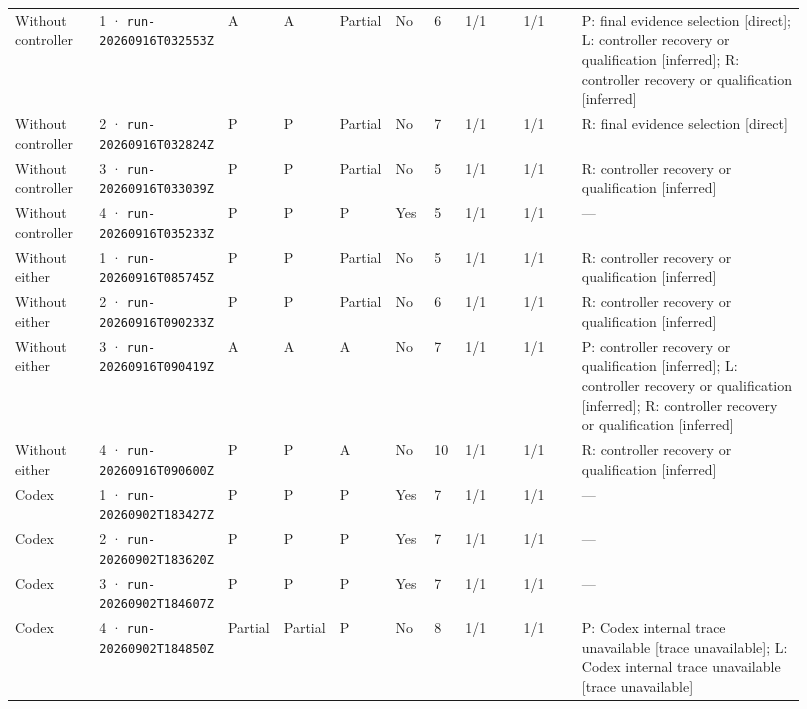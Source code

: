 \begin{landscape}
\begin{longtable}{@{}L{0.11\linewidth}L{0.16\linewidth}*{3}{L{0.022\linewidth}}L{0.05\linewidth}L{0.045\linewidth}L{0.08\linewidth}L{0.085\linewidth}L{0.324\linewidth}@{}}
Without controller & 1 · \texttt{run-20260916\allowbreak T032553Z} & A & A & Partial & No & 6 & 1/1 & 1/1 & P: final evidence selection [direct]; L: controller recovery or qualification [inferred]; R: controller recovery or qualification [inferred] \\
Without controller & 2 · \texttt{run-20260916\allowbreak T032824Z} & P & P & Partial & No & 7 & 1/1 & 1/1 & R: final evidence selection [direct] \\
Without controller & 3 · \texttt{run-20260916\allowbreak T033039Z} & P & P & Partial & No & 5 & 1/1 & 1/1 & R: controller recovery or qualification [inferred] \\
Without controller & 4 · \texttt{run-20260916\allowbreak T035233Z} & P & P & P & Yes & 5 & 1/1 & 1/1 & --- \\
Without either & 1 · \texttt{run-20260916\allowbreak T085745Z} & P & P & Partial & No & 5 & 1/1 & 1/1 & R: controller recovery or qualification [inferred] \\
Without either & 2 · \texttt{run-20260916\allowbreak T090233Z} & P & P & Partial & No & 6 & 1/1 & 1/1 & R: controller recovery or qualification [inferred] \\
Without either & 3 · \texttt{run-20260916\allowbreak T090419Z} & A & A & A & No & 7 & 1/1 & 1/1 & P: controller recovery or qualification [inferred]; L: controller recovery or qualification [inferred]; R: controller recovery or qualification [inferred] \\
Without either & 4 · \texttt{run-20260916\allowbreak T090600Z} & P & P & A & No & 10 & 1/1 & 1/1 & R: controller recovery or qualification [inferred] \\
Codex & 1 · \texttt{run-20260902\allowbreak T183427Z} & P & P & P & Yes & 7 & 1/1 & 1/1 & --- \\
Codex & 2 · \texttt{run-20260902\allowbreak T183620Z} & P & P & P & Yes & 7 & 1/1 & 1/1 & --- \\
Codex & 3 · \texttt{run-20260902\allowbreak T184607Z} & P & P & P & Yes & 7 & 1/1 & 1/1 & --- \\
Codex & 4 · \texttt{run-20260902\allowbreak T184850Z} & Partial & Partial & P & No & 8 & 1/1 & 1/1 & P: Codex internal trace unavailable [trace unavailable]; L: Codex internal trace unavailable [trace unavailable] \\
\end{longtable}
\endgroup
\end{landscape}
\endgroup
